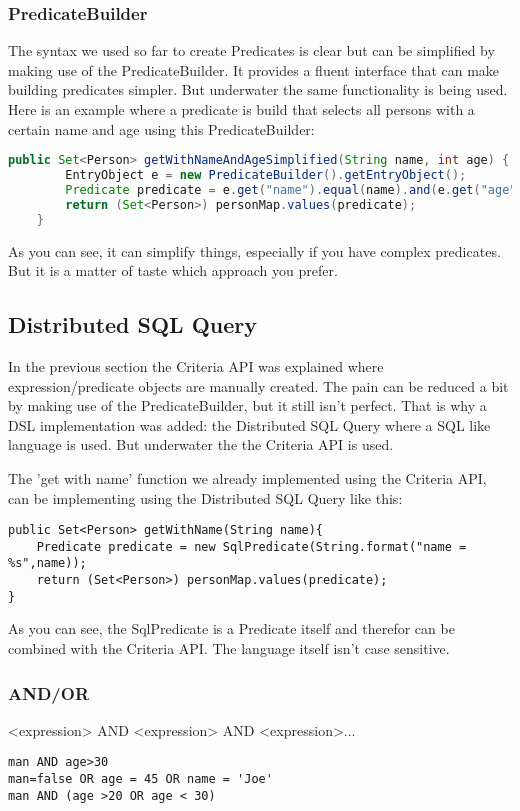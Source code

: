 \subsubsection*{PredicateBuilder}
The syntax we used so far to create Predicates is clear but can be simplified by making use of the PredicateBuilder. It provides a fluent interface that can make building predicates simpler. But underwater the same functionality is being used. Here is an example where a predicate is build that selects all persons with a certain name and age using this PredicateBuilder:
\begin{lstlisting}[language=java]
    public Set<Person> getWithNameAndAgeSimplified(String name, int age) {
        EntryObject e = new PredicateBuilder().getEntryObject();
        Predicate predicate = e.get("name").equal(name).and(e.get("age").equal(age));
        return (Set<Person>) personMap.values(predicate);
    }
\end{lstlisting}
As you can see, it can simplify things, especially if you have complex predicates. But it is a matter of taste which approach you prefer.

\subsection*{Distributed SQL Query}
In the previous section the Criteria API was explained where expression/predicate objects are manually created. The pain can be reduced a bit by making use of the PredicateBuilder, but it still isn't perfect. That is why a DSL implementation was added: the Distributed SQL Query where a SQL like language is used. But underwater the the Criteria API is used. 

The 'get with name' function we already implemented using the Criteria API, can be implementing using the Distributed SQL Query like this:
\begin{lstlisting}
public Set<Person> getWithName(String name){
    Predicate predicate = new SqlPredicate(String.format("name = %s",name));
    return (Set<Person>) personMap.values(predicate);
}
\end{lstlisting}
As you can see, the SqlPredicate is a Predicate itself and therefor can be combined with the Criteria API. The language itself isn't case sensitive.

\subsubsection*{AND/OR}
<expression> AND <expression> AND <expression>...
\begin{lstlisting}
man AND age>30
man=false OR age = 45 OR name = 'Joe'
man AND (age >20 OR age < 30)
\end{lstlisting}


